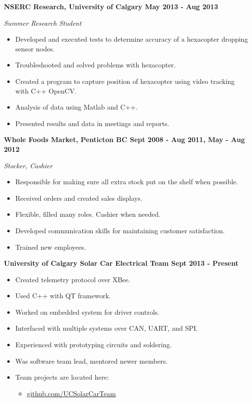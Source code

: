 \documentclass[12pt]{article}
\begin{document}
\noindent \centerline{ \bf NSERC Research, University of Calgary \hfill May 2013 - Aug 2013}
\indent \emph{ Summer Research Student }
\begin{itemize}
  \item Developed and executed tests to determine accuracy of a hexacopter dropping sensor nodes.
  \item Troubleshooted and solved problems with hexacopter.
  \item Created a program to capture position of hexacopter using video tracking with C++ OpenCV.
  \item Analysis of data using Matlab and C++.
  \item Presented results and data in meetings and reports.
\end{itemize}

\noindent \centerline{ \bf Whole Foods Market, Penticton BC \hfill Sept 2008 - Aug 2011, May - Aug 2012}
\indent \emph{Stocker, Cashier}
\begin{itemize}
  \item Responsible for making sure all extra stock put on the shelf when possible.
  \item Received orders and created sales displays.
  \item Flexible, filled many roles. Cashier when needed.
  \item Developed communication skills for maintaining customer satisfaction.
  \item Trained new employees.
\end{itemize}

\bigskip
{}
\bigskip

\noindent \centerline{\bf University of Calgary Solar Car Electrical Team \hfill Sept 2013 - Present}
\begin{itemize}
  \item Created telemetry protocol over XBee.
  \item Used C++ with QT framework.
  \item Worked on embedded system for driver controls.
  \item Interfaced with multiple systems over CAN, UART, and SPI.
  \item Experienced with prototyping circuits and soldering.
  \item Was software team lead, mentored newer members.
  \item Team projects are located here:
\begin{itemize}
  \item \url{github.com/UCSolarCarTeam}
\end{itemize}
\end{itemize}
\end{document}
